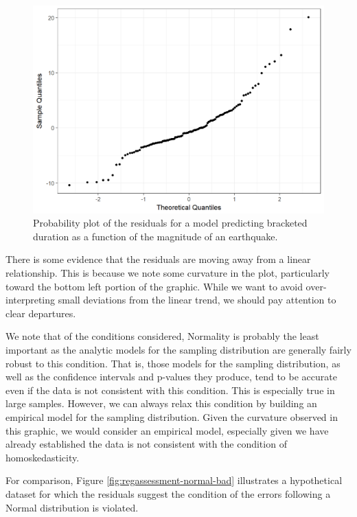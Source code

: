 \documentclass[]{book}
\theoremstyle{plain}
\theoremstyle{mydefn}
\theoremstyle{myexmpl}
\theoremstyle{remark}
\begin{document}
\begin{figure}

{\centering \includegraphics[width=0.8\linewidth]{./Images/regassessment-normal-1} 

}

\caption{Probability plot of the residuals for a model predicting bracketed duration as a function of the magnitude of an earthquake.}\label{fig:regassessment-normal}
\end{figure}

There is some evidence that the residuals are moving away from a linear
relationship. This is because we note some curvature in the plot,
particularly toward the bottom left portion of the graphic. While we
want to avoid over-interpreting small deviations from the linear trend,
we should pay attention to clear departures.

We note that of the conditions considered, Normality is probably the
least important as the analytic models for the sampling distribution are
generally fairly robust to this condition. That is, those models for the
sampling distribution, as well as the confidence intervals and p-values
they produce, tend to be accurate even if the data is not consistent
with this condition. This is especially true in large samples. However,
we can always relax this condition by building an empirical model for
the sampling distribution. Given the curvature observed in this graphic,
we would consider an empirical model, especially given we have already
established the data is not consistent with the condition of
homoskedasticity.

For comparison, Figure \ref{fig:regassessment-normal-bad} illustrates a
hypothetical dataset for which the residuals suggest the condition of
the errors following a Normal distribution is violated.
\end{document}
